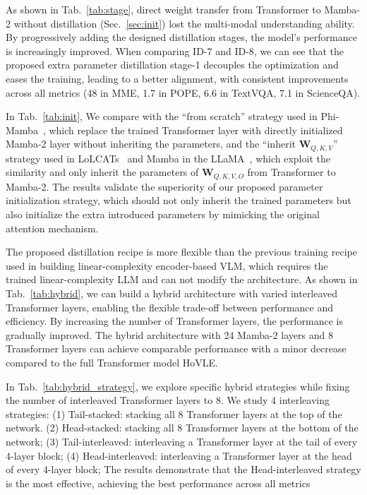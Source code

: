

As shown in Tab.~\ref{tab:stage}, direct weight transfer from Transformer to Mamba-2 without distillation (Sec.~\ref{sec:init}) lost the multi-modal understanding ability.
By progressively adding the designed distillation stages, the model's performance is increasingly improved.
When comparing ID-7 and ID-8, we can see that the proposed extra parameter distillation stage-1 decouples the optimization and eases the training, leading to a better alignment, with consistent improvements across all metrics 
(48 in MME, 1.7 in POPE, 6.6 in TextVQA, 7.1 in ScienceQA).






In Tab.~\ref{tab:init}, 
We compare with the ``from scratch'' strategy used in Phi-Mamba~\cite{bick2024transformers}, which replace the trained Transformer layer with directly initialized Mamba-2 layer without inheriting the parameters,
and the ``inherit $\boldsymbol{W}_{Q,K,V}$'' strategy used in LoLCATs~\cite{zhang2024lolcats} and Mamba in the LLaMA~\cite{wang2024mamba}, which exploit the similarity and only inherit the parameters of $\boldsymbol{W}_{Q,K,V,O}$ from Transformer to Mamba-2.
The results validate the superiority of our proposed parameter initialization strategy, which should not only inherit the trained parameters but also initialize the extra introduced parameters by mimicking the original attention mechanism.







The proposed distillation recipe is more flexible than the previous training recipe used in building linear-complexity encoder-based VLM, which requires the trained linear-complexity LLM and can not modify the architecture.
As shown in Tab.~\ref{tab:hybrid}, we can build a hybrid architecture with varied interleaved Transformer layers, enabling the flexible trade-off between performance and efficiency.
By increasing the number of Transformer layers, the performance is gradually improved.
The hybrid architecture with 24 Mamba-2 layers and 8 Transformer layers can achieve comparable performance with a minor decrease compared to the full Transformer model HoVLE.



In Tab.~\ref{tab:hybrid_strategy}, we explore specific hybrid strategies while fixing the number of interleaved Transformer layers to 8. 
We study 4 interleaving strategies: 
(1) Tail-stacked: stacking all 8 Transformer layers at the top of the network. 
(2) Head-stacked: stacking all 8 Transformer layers at the bottom of the network;
(3) Tail-interleaved: interleaving a Transformer layer at the tail of every 4-layer block; 
(4) Head-interleaved: interleaving a Transformer layer at the head of every 4-layer block; 
The results demonstrate that the Head-interleaved strategy is the most effective, achieving the best performance across all metrics 






